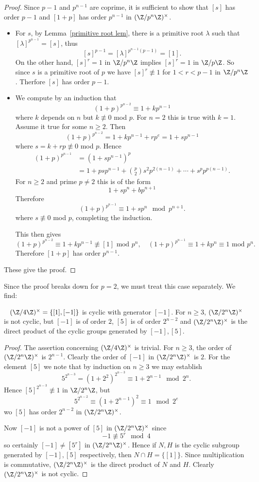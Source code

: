 \begin{proof}
Since $p-1$ and $p^{n-1}$ are coprime, it is sufficient to show that $[s]$ has order $p-1$ and $[1+p]$ has order $p^{n-1}$ in $(\Z/p^n\Z)^\times$.
\begin{itemize}
\item For $s$, by Lemma~\ref{primitive root lem}, there is a primitive root $\lambda$ such that $[\lambda]^{p^{n-1}}=[s]$, thus
\[[s]^{p-1}=[\lambda]^{p^{n-1}(p-1)}=[1].\]
On the other hand, $[s]^r=1$ in $\Z/p^n\Z$ implies $[s]^r=1$ in $\Z/p\Z$. So since $s$ is a primitive root of $p$ we have $[s]^r\not\equiv 1$ for $1<r<p-1$ in $\Z/p^n\Z$. Therfore $[s]$ has order $p-1$.
\item We compute by an induction that
\[(1+p)^{p^{n-2}}\equiv 1+kp^{n-1}\]
where $k$ depends on $n$ but $k\not\equiv 0$ mod $p$. For $n=2$ this is true with $k=1$. Assume it true for some $n\geq2$. Then 
\[(1+p)^{p^{n-2}}=1+kp^{n-1}+rp^e=1+sp^{n-1}\]
where $s=k+rp\not\equiv 0$ mod $p$. Hence
\begin{align*}
(1+p)^{p^{n-1}}&=(1+sp^{n-1})^p\\
&=1+psp^{n-1}+\binom{p}{2}s^2p^{2(n-1)}+\cdots+s^pp^{p(n-1)}.
\end{align*}
For $n\geq2$ and prime $p\neq2$ this is of the form
\[1+sp^n+bp^{n+1}\]
Therefore
\[(1+p)^{p^{n-1}}\equiv 1+sp^n\mod p^{n+1}.\]
where $s\not\equiv0$ mod $p$, completing the induction.\par
This then gives
\[(1+p)^{p^{n-2}}\equiv 1+kp^{n-1}\not\equiv[1]\text{ mod $p^n$},\quad (1+p)^{p^{n-1}}\equiv 1+kp^{n}\equiv 1\text{ mod $p^n$}.\]
Therefore $[1+p]$ has order $p^{n-1}$.
\end{itemize}
These give the proof.
\end{proof}
Since the proof breaks down for $p=2$, we must treat this case separately. We find:
\begin{proposition}~\label{unit Z/2^nZ}
$(\Z/4\Z)^\times=\{[1],[-1]\}$ is cyclic with generator $[-1]$. For $n\geq3$, $(\Z/2^n\Z)^{\times}$ is not cyclic, but $[-1]$ is of order $2$, $[5]$ is of order $2^{n-2}$ and $(\Z/2^n\Z)^{\times}$ is the direct product of the cyclic groups generated by $[-1],[5]$.
\end{proposition}
\begin{proof}
The assertion concerning $(\Z/4\Z)^\times$ is trivial. For $n\geq3$, the order of $(\Z/2^n\Z)^\times$ is $2^{n-1}$. Clearly the order of $[-1]$ in $(\Z/2^n\Z)^\times$ is $2$. For the element $[5]$ we note that by induction on $n\geq3$ we may establish
\[5^{2^{n-3}}=(1+2^2)^{2^{n-3}}\equiv 1+2^{n-1}\mod 2^n.\]
Hence $[5]^{2^{n-3}}\not\equiv1$ in $\Z/2^n\Z$, but
\[5^{2^{n-2}}\equiv(1+2^{n-1})^2\equiv 1\mod 2^e\]
wo $[5]$ has order $2^{n-2}$ in $(\Z/2^n\Z)^\times$.\par
Now $[-1]$ is not a power of $[5]$ in $(\Z/2^n\Z)^\times$ since
\[-1\not\equiv 5^r\mod 4\]
so certainly $[-1]\neq[5^r]$ in $(\Z/2^n\Z)^\times$. Hence if $N,H$ is the cyclic subgroup generated by $[-1],[5]$ respectively, then $N\cap H=\{[1]\}$. Since multiplication is commutative, $(\Z/2^n\Z)^\times$ is the direct product of $N$ and $H$. Clearly $(\Z/2^n\Z)^\times$ is not cyclic.
\end{proof}
